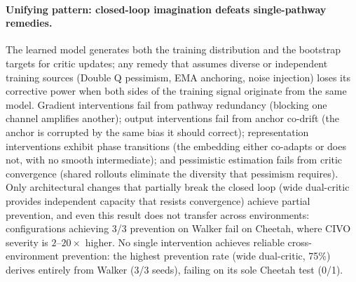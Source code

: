 \paragraph{Unifying pattern: closed-loop imagination defeats single-pathway remedies.}
\label{sec:unifying}
The learned model generates both the training distribution and the bootstrap targets for critic updates; any remedy that assumes diverse or independent training sources (Double Q pessimism, EMA anchoring, noise injection) loses its corrective power when both sides of the training signal originate from the same model. Gradient interventions fail from pathway redundancy (blocking one channel amplifies another); output interventions fail from anchor co-drift (the anchor is corrupted by the same bias it should correct); representation interventions exhibit phase transitions (the embedding either co-adapts or does not, with no smooth intermediate); and pessimistic estimation fails from critic convergence (shared rollouts eliminate the diversity that pessimism requires). Only architectural changes that partially break the closed loop (wide dual-critic provides independent capacity that resists convergence) achieve partial prevention, and even this result does not transfer across environments: configurations achieving 3/3 prevention on Walker fail on Cheetah, where CIVO severity is $2$--$20\times$ higher. No single intervention achieves reliable cross-environment prevention: the highest prevention rate (wide dual-critic, 75\%) derives entirely from Walker (3/3 seeds), failing on its sole Cheetah test (0/1).

